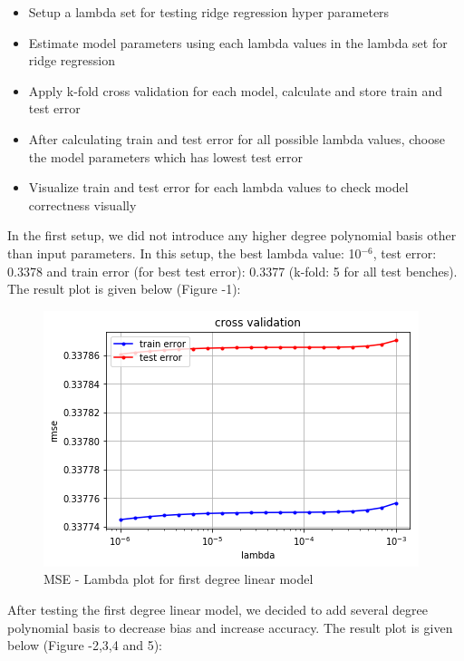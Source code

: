 \documentclass[10pt,conference,compsocconf]{IEEEtran}
\begin{document}
\begin{itemize}
\item Setup a lambda set for testing ridge regression hyper parameters
\item Estimate model parameters using each lambda values in the lambda 
set for ridge regression
\item Apply k-fold cross validation for each model, calculate and store 
train and test error
\item After calculating train and test error for all possible lambda 
values, choose the model parameters which has lowest test error
\item Visualize train and test error for each lambda values to check 
model correctness visually
\end{itemize}
In the first setup, we did not introduce any higher degree polynomial 
basis other than input parameters. In this setup, the best lambda value: 
10$^{-6}$, test error: 0.3378 and train error (for best test error): 
0.3377 (k-fold: 5 for all test benches). The result plot is given below 
(Figure -1):
\begin{center}
\begin{figure}[h]
\includegraphics[scale=0.5]{linear_1}
\centering
\caption{MSE - Lambda plot for first degree linear model}
\end{figure}
\end{center}
\vspace{-15pt}
After testing the first degree linear model, we decided to add several degree polynomial basis to decrease bias and increase accuracy. The result plot is given below (Figure -2,3,4 and 5):
\end{document}
